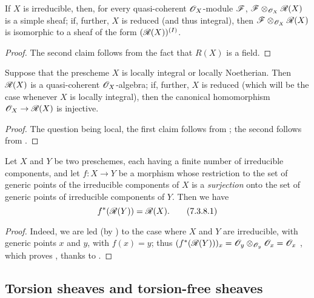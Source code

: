 \begin{cor}[7.3.6]
\label{1.7.3.6}
If $X$ is irreducible, then, for every quasi-coherent $\mathscr{O}_X$-module $\mathscr{F}$, $\mathscr{F}\otimes_{\mathscr{O}_X}\mathscr{R}(X)$ is a simple sheaf; if, further, $X$ is reduced (and thus integral), then $\mathscr{F}\otimes_{\mathscr{O}_X}\mathscr{R}(X)$ is isomorphic to a sheaf of the form $(\mathscr{R}(X))^{(I)}$.
\end{cor}

\begin{proof}
\label{proof-1.7.3.6}
The second claim follows from the fact that $R(X)$ is a field.
\end{proof}

\begin{prop}[7.3.7]
\label{1.7.3.7}
Suppose that the prescheme $X$ is locally integral or locally Noetherian.
Then $\mathscr{R}(X)$ is a quasi-coherent $\mathscr{O}_X$-algebra; if, further, $X$ is reduced (which will be the case whenever $X$ is locally integral), then the canonical homomorphism $\mathscr{O}_X\to\mathscr{R}(X)$ is injective.
\end{prop}

\begin{proof}
\label{proof-1.7.3.7}
The question being local, the first claim follows from ; the second follows from .
\end{proof}

\begin{env}[7.3.8]
\label{1.7.3.8}
Let $X$ and $Y$ be two preschemes, each having a finite number of irreducible components, and let $f\colon X\to Y$ be a morphism whose restriction to the set of generic points of the irreducible components of $X$ is a \emph{surjection} onto the set of generic points of irreducible components of $Y$.
Then we have
\begin{equation*}
    f^*(\mathscr{R}(Y)) = \mathscr{R}(X).
    \tag{7.3.8.1}
\end{equation*}
\end{env}

\begin{proof}
\label{proof-1.7.3.8}
Indeed, we are led (by ) to the case where $X$ and $Y$ are irreducible, with generic points $x$ and $y$, with $f(x)=y$; thus $(f^*(\mathscr{R}(Y)))_x = \mathscr{O}_y\otimes_{\mathscr{O}_y}\mathscr{O}_x = \mathscr{O}_x$ , which proves , thanks to .
\end{proof}

\subsection{Torsion sheaves and torsion-free sheaves}
\label{subsection-torsion-sheaves-and-torsion-free-sheaves}

